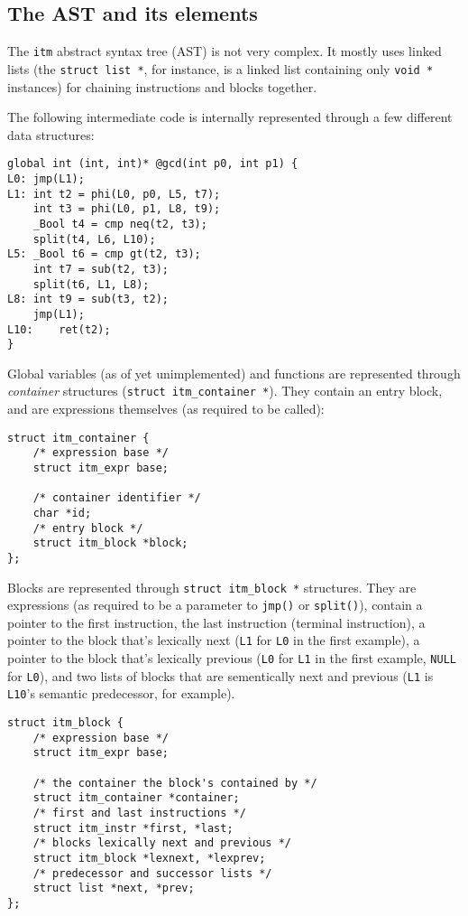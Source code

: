\documentclass[12pt, a4paper]{article}
\begin{document}
  \subsection{The AST and its elements}
The \verb+itm+ abstract syntax tree (AST) is not very complex. It mostly uses
linked lists (the \verb+struct list *+, for instance, is a linked list containing
only \verb+void *+ instances) for chaining instructions and blocks together.

The following intermediate code is internally represented through a few different
data structures:

\begin{lstlisting}
global int (int, int)* @gcd(int p0, int p1) {
L0:	jmp(L1);
L1:	int t2 = phi(L0, p0, L5, t7);
	int t3 = phi(L0, p1, L8, t9);
	_Bool t4 = cmp neq(t2, t3);
	split(t4, L6, L10);
L5:	_Bool t6 = cmp gt(t2, t3);
	int t7 = sub(t2, t3);
	split(t6, L1, L8);
L8:	int t9 = sub(t3, t2);
	jmp(L1);
L10:	ret(t2);
}
\end{lstlisting}

Global variables (as of yet unimplemented) and functions are represented through
\textit{container} structures (\verb+struct itm_container *+). They contain an
entry block, and are expressions themselves (as required to be called):

\begin{lstlisting}
struct itm_container {
	/* expression base */
	struct itm_expr base;

	/* container identifier */
	char *id;
	/* entry block */
	struct itm_block *block;
};
\end{lstlisting}

Blocks are represented through \verb+struct itm_block *+ structures. They are
expressions (as required to be a parameter to \verb+jmp()+ or \verb+split()+),
contain a pointer to the first instruction, the last instruction (terminal
instruction), a pointer to the block that's lexically next (\verb+L1+ for
\verb+L0+ in the first example), a pointer to the block that's lexically previous
(\verb+L0+ for \verb+L1+ in the first example, \verb+NULL+ for \verb+L0+),
and two lists of blocks that are sementically next and previous (\verb+L1+ is
\verb+L10+'s semantic predecessor, for example).

\begin{lstlisting}
struct itm_block {
	/* expression base */
	struct itm_expr base;

	/* the container the block's contained by */
	struct itm_container *container;
	/* first and last instructions */
	struct itm_instr *first, *last;
	/* blocks lexically next and previous */
	struct itm_block *lexnext, *lexprev;
	/* predecessor and successor lists */
	struct list *next, *prev;
};
\end{lstlisting}
\end{document}
